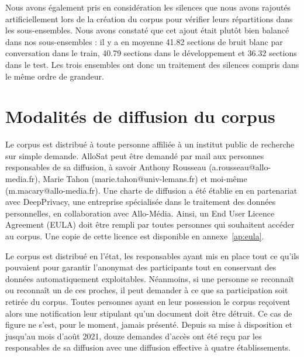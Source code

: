 Nous avons également pris en considération les silences que nous avons rajoutés artificiellement lors de la création du corpus pour vérifier leurs répartitions dans les sous-ensembles.
Nous avons constaté que cet ajout était plutôt bien balancé dans nos sous-ensembles : il y a en moyenne 41.82 sections de bruit blanc par conversation dans le train, 40.79 sections dans le développement et 36.32 sections dans le test.
Les trois ensembles ont donc un traitement des silences compris dans le même ordre de grandeur.

\section{Modalités de diffusion du corpus}
Le corpus est distribué à toute personne affiliée à un institut public de recherche sur simple demande. %
AlloSat peut être demandé par mail aux personnes responsables de sa diffusion, à savoir Anthony Rousseau (a.rousseau@allo-media.fr), Marie Tahon (marie.tahon@univ-lemans.fr) et moi-même (m.macary@allo-media.fr). Une charte de diffusion a été établie en en partenariat avec DeepPrivacy, une entreprise spécialisée dans le traitement des données personnelles, en collaboration avec Allo-Média. Ainsi, un End User Licence Agreement (EULA) doit être rempli par toutes personnes qui souhaitent accéder au corpus. Une copie de cette licence est disponible en annexe~\ref{ap:eula}.

Le corpus est distribué en l'état, les responsables ayant mis en place tout ce qu'ils pouvaient pour garantir l'anonymat des participants tout en conservant des données automatiquement exploitables. Néanmoins, si une personne se reconnaît ou reconnaît un de ces proches, il peut demander à ce que sa participation soit retirée du corpus.
Toutes personnes ayant en leur possession le corpus reçoivent alors une notification leur stipulant qu'un document doit être détruit. Ce cas de figure ne s'est, pour le moment, jamais présenté.
Depuis sa mise à disposition et jusqu'au mois d’août 2021, douze demandes d'accès ont été reçu par les responsables de sa diffusion avec une diffusion effective à quatre établissements.

